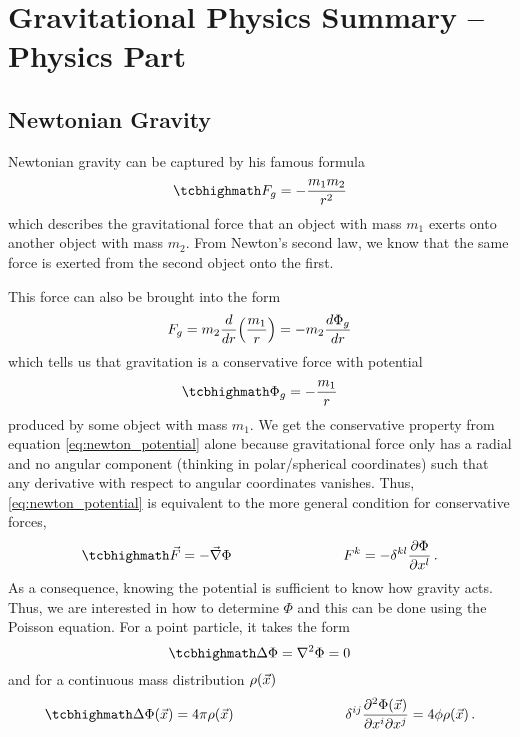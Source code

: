 \newpage



	\section{Gravitational Physics Summary -- Physics Part}



		\subsection{Newtonian Gravity}
Newtonian gravity can be captured by his famous formula
\begin{equation}
\eqbox{
F_g = - \frac{m_1 m_2}{r^2}
}
\end{equation}
which describes the gravitational force that an object with mass $m_1$ exerts onto another object with mass $m_2$. From Newton's second law, we know that the same force is exerted from the second object onto the first.


This force can also be brought into the form
\begin{equation}\label{eq:newton_potential}
F_g = m_2 \dv{r}\qty(\frac{m_1}{r}) = - m_2 \dv{\Phi_g}{r}
\end{equation}
which tells us that gravitation is a conservative force with potential 
\begin{equation}
\eqbox{
\Phi_g = - \frac{m_1}{r}
}
\end{equation}
produced by some object with mass $m_1$. We get the conservative property from equation \eqref{eq:newton_potential} alone because gravitational force only has a radial and no angular component (thinking in polar/spherical coordinates) such that any derivative with respect to angular coordinates %
 vanishes. Thus, \eqref{eq:newton_potential} is equivalent to the more general condition for conservative forces,
\begin{equation}\label{eq:cons_force}
\eqbox{
\vec{F} = - \vec{\nabla} \Phi
}
\manyqquad
F^k = - \delta^{k l} \pdv{\Phi}{x^l} \, .
\end{equation}
As a consequence, knowing the potential is sufficient to know how gravity acts. Thus, we are interested in how to determine $\Phi$ and this can be done using the Poisson equation. For a point particle, it takes the form
\begin{equation}
\eqbox{
\Delta \Phi = \nabla^2 \Phi = 0
}
\end{equation}
and for a continuous mass distribution $\rho\qty(\vec{x})$
\begin{equation}\label{eq:field_eq_newton}
\eqbox{
\Delta \Phi\qty(\vec{x}) = 4 \pi \rho\qty(\vec{x})
}
\manyqquad
\delta^{ij} \pdv[2]{\Phi(\vec{x})}{x^i}{x^j} = 4 \phi \rho\qty(\vec{x}) \, .
\end{equation}


